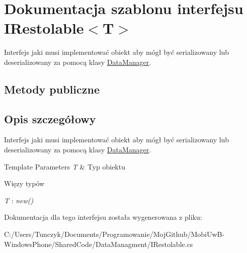 \hypertarget{a00031}{}\section{Dokumentacja szablonu interfejsu I\+Restolable$<$T$>$}
\label{a00031}


Interfejs jaki musi implementować obiekt aby mógł być serializowany lub deserializowany za pomocą klasy \hyperlink{a00017}{Data\+Manager}.  


\subsection*{Metody publiczne}


\subsection{Opis szczegółowy}
Interfejs jaki musi implementować obiekt aby mógł być serializowany lub deserializowany za pomocą klasy \hyperlink{a00017}{Data\+Manager}. 


\begin{DoxyTemplParams}{Template Parameters}
{\em T} & Typ obiektu\\
\hline
\end{DoxyTemplParams}
\begin{Desc}
\item[Więzy typów]\begin{description}
\item[{\em T} : {\em new()}]\end{description}
\end{Desc}


Dokumentacja dla tego interfejsu została wygenerowana z pliku\+:\begin{DoxyCompactItemize}
\item 
C\+:/\+Users/\+Tunczyk/\+Documents/\+Programowanie/\+Moj\+Github/\+Mobi\+Uw\+B-\/\+Windows\+Phone/\+Shared\+Code/\+Data\+Managment/I\+Restolable.\+cs\end{DoxyCompactItemize}
